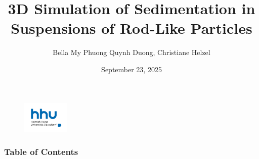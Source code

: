 \documentclass[lightblue, notheorems, xcolor=dvipsnames]{beamer}
\theoremstyle{definition}
\theoremstyle{plain}
\theoremstyle{example}
\begin{document}
  \author{Bella My Phuong Quynh Duong, Christiane Helzel}
  \date{September 23, 2025} %
  \title{3D Simulation of Sedimentation in Suspensions of Rod-Like Particles}
  
  \begin{frame}
  	\titlepage
  	\begin{figure}[htpb]
  		\begin{center}
  			\includegraphics[width=0.2\textwidth]{logo.png}
  		\end{center}
  	\end{figure}
  \end{frame}
\begin{frame}
   \frametitle{Table of Contents}
\tableofcontents %
\end{frame}




%

\end{document}
